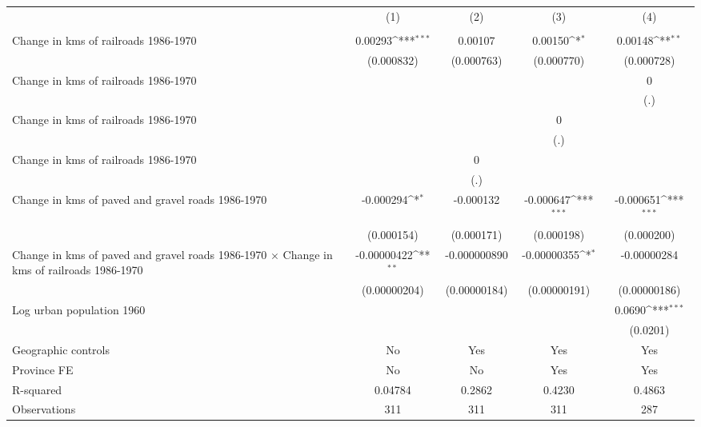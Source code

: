 {
\def\sym#1{\ifmmode^{#1}\else\(^{#1}\)\fi}
\begin{tabular}{l*{4}{c}}
\hline\hline
                &\multicolumn{1}{c}{(1)}&\multicolumn{1}{c}{(2)}&\multicolumn{1}{c}{(3)}&\multicolumn{1}{c}{(4)}\\
                &\multicolumn{1}{c}{}&\multicolumn{1}{c}{}&\multicolumn{1}{c}{}&\multicolumn{1}{c}{}\\
\hline
Change in kms of railroads 1986-1970&  0.00293\sym{***}&  0.00107         &  0.00150\sym{*}  &  0.00148\sym{**} \\
                &(0.000832)         &(0.000763)         &(0.000770)         &(0.000728)         \\
[1em]
Change in kms of railroads 1986-1970&                  &                  &                  &        0         \\
                &                  &                  &                  &      (.)         \\
[1em]
Change in kms of railroads 1986-1970&                  &                  &        0         &                  \\
                &                  &                  &      (.)         &                  \\
[1em]
Change in kms of railroads 1986-1970&                  &        0         &                  &                  \\
                &                  &      (.)         &                  &                  \\
[1em]
Change in kms of paved and gravel roads 1986-1970&-0.000294\sym{*}  &-0.000132         &-0.000647\sym{***}&-0.000651\sym{***}\\
                &(0.000154)         &(0.000171)         &(0.000198)         &(0.000200)         \\
[1em]
Change in kms of paved and gravel roads 1986-1970 $\times$ Change in kms of railroads 1986-1970&-0.00000422\sym{**} &-0.000000890         &-0.00000355\sym{*}  &-0.00000284         \\
                &(0.00000204)         &(0.00000184)         &(0.00000191)         &(0.00000186)         \\
[1em]
Log urban population 1960&                  &                  &                  &   0.0690\sym{***}\\
                &                  &                  &                  & (0.0201)         \\
\hline
Geographic controls&       No         &      Yes         &      Yes         &      Yes         \\
Province FE     &       No         &       No         &      Yes         &      Yes         \\
R-squared       &  0.04784         &   0.2862         &   0.4230         &   0.4863         \\
Observations    &      311         &      311         &      311         &      287         \\
\hline\hline
\end{tabular}
}
